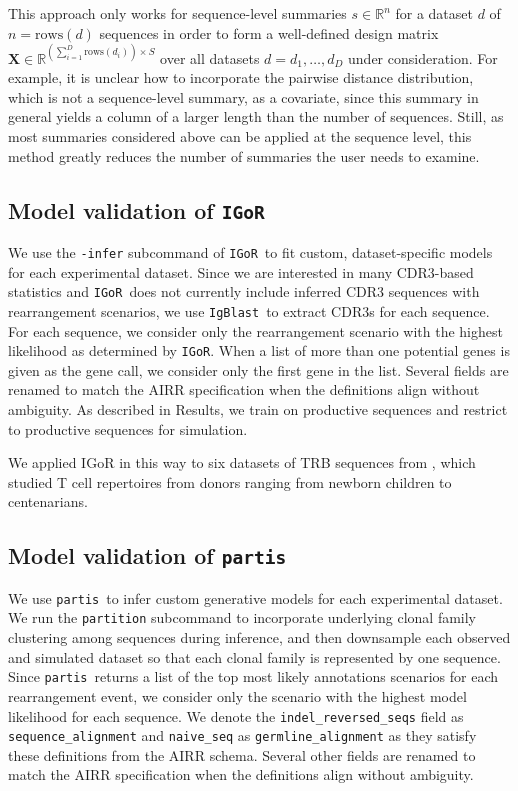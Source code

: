 \documentclass{article}
\newcommand{\partis}{\texttt{partis}}
\newcommand{\igor}{\texttt{IGoR}}
\newcommand{\igblast}{\texttt{IgBlast}}
\begin{document}
This approach only works for sequence-level summaries $s \in \mathbb{R}^n$ for a dataset $d$ of $n = \text{rows}(d)$ sequences in order to form a well-defined design matrix $\mathbf X \in \mathbb{R}^{\left(\sum_{i=1}^D \text{rows}(d_i) \right) \times S}$ over all datasets $d = d_1, \dotsc, d_D$ under consideration.
For example, it is unclear how to incorporate the pairwise distance distribution, which is not a sequence-level summary, as a covariate, since this summary in general yields a column of a larger length than the number of sequences.
Still, as most summaries considered above can be applied at the sequence level, this method greatly reduces the number of summaries the user needs to examine.

\subsection*{Model validation of \igor}
We use the \texttt{-infer} subcommand of \igor\ to fit custom, dataset-specific models for each experimental dataset.
Since we are interested in many CDR3-based statistics and \igor\ does not currently include inferred CDR3 sequences with rearrangement scenarios, we use \igblast\ to extract CDR3s for each sequence.
For each sequence, we consider only the rearrangement scenario with the highest likelihood as determined by \igor.
When a list of more than one potential genes is given as the gene call, we consider only the first gene in the list.
Several fields are renamed to match the AIRR specification when the definitions align without ambiguity.
As described in Results, we train on productive sequences and restrict to productive sequences for simulation.

We applied IGoR in this way to six datasets of TRB sequences from \cite{Britanova2016-iw}, which studied T cell repertoires from donors ranging from newborn children to centenarians.

\subsection*{Model validation of \partis}

We use \partis\ to infer custom generative models for each experimental dataset.
We run the \texttt{partition} subcommand to incorporate underlying clonal family clustering among sequences during inference, and then downsample each observed and simulated dataset so that each clonal family is represented by one sequence.
Since \partis\ returns a list of the top most likely annotations scenarios for each rearrangement event, we consider only the scenario with the highest model likelihood for each sequence.
We denote the \texttt{indel\_reversed\_seqs} field as \texttt{sequence\_alignment} and \texttt{naive\_seq} as \texttt{germline\_alignment} as they satisfy these definitions from the AIRR schema.
Several other fields are renamed to match the AIRR specification when the definitions align without ambiguity.
\end{document}
